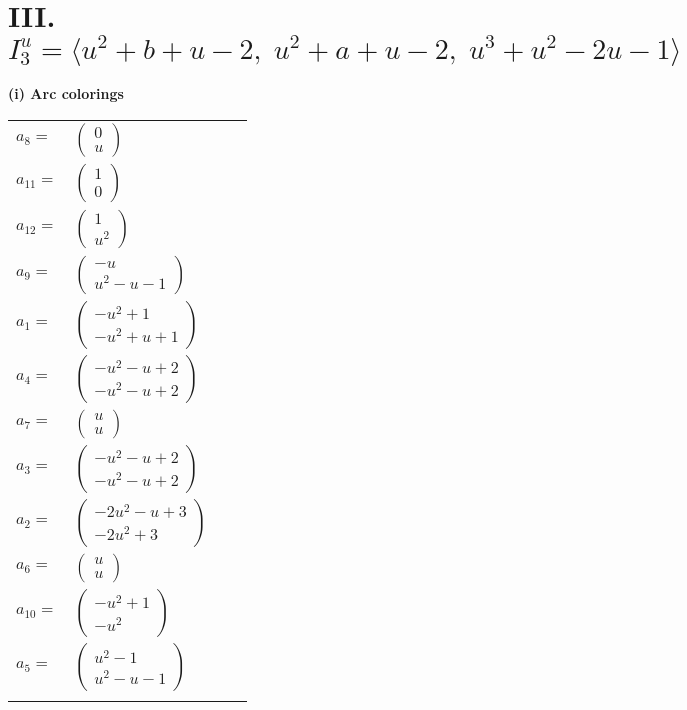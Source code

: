 \documentclass[1p]{elsarticle_modified}
\theoremstyle{definition}
\begin{document}
\centering \section*{III. $I^u_{3}= \langle u^2+b+u-2,\;u^2+a+u-2,\;u^3+u^2-2 u-1 \rangle$}
\flushleft \textbf{(i) Arc colorings}\\
\begin{tabular}{m{7pt} m{180pt} m{7pt} m{180pt} }
\flushright $a_{8}=$&$\begin{pmatrix}0\\u\end{pmatrix}$ \\
\flushright $a_{11}=$&$\begin{pmatrix}1\\0\end{pmatrix}$ \\
\flushright $a_{12}=$&$\begin{pmatrix}1\\u^2\end{pmatrix}$ \\
\flushright $a_{9}=$&$\begin{pmatrix}- u\\u^2- u-1\end{pmatrix}$ \\
\flushright $a_{1}=$&$\begin{pmatrix}- u^2+1\\- u^2+u+1\end{pmatrix}$ \\
\flushright $a_{4}=$&$\begin{pmatrix}- u^2- u+2\\- u^2- u+2\end{pmatrix}$ \\
\flushright $a_{7}=$&$\begin{pmatrix}u\\u\end{pmatrix}$ \\
\flushright $a_{3}=$&$\begin{pmatrix}- u^2- u+2\\- u^2- u+2\end{pmatrix}$ \\
\flushright $a_{2}=$&$\begin{pmatrix}-2 u^2- u+3\\-2 u^2+3\end{pmatrix}$ \\
\flushright $a_{6}=$&$\begin{pmatrix}u\\u\end{pmatrix}$ \\
\flushright $a_{10}=$&$\begin{pmatrix}- u^2+1\\- u^2\end{pmatrix}$ \\
\flushright $a_{5}=$&$\begin{pmatrix}u^2-1\\u^2- u-1\end{pmatrix}$\\&\end{tabular}
\end{document}
